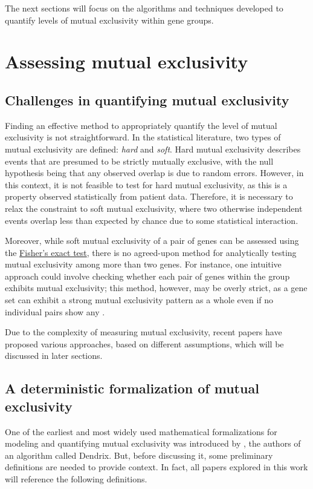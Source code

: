 The next sections will focus on the algorithms and techniques developed to quantify levels of mutual exclusivity within gene groups.

\section{Assessing mutual exclusivity}

\subsection{Challenges in quantifying mutual exclusivity}

Finding an effective method to appropriately quantify the level of mutual exclusivity is not straightforward. In the statistical literature, two types of mutual exclusivity are defined: \textit{hard} and \textit{soft}. Hard mutual exclusivity describes events that are presumed to be strictly mutually exclusive, with the null hypothesis being that any observed overlap is due to random errors. However, in this context, it is not feasible to test for hard mutual exclusivity, as this is a property observed statistically from patient data. Therefore, it is necessary to relax the constraint to soft mutual exclusivity, where two otherwise independent events overlap less than expected by chance due to some statistical interaction.

Moreover, while soft mutual exclusivity of a pair of genes can be assessed using the \href{https://en.wikipedia.org/wiki/Fisher\%27s_exact_test}{Fisher's exact test}, there is no agreed-upon method for analytically testing mutual exclusivity among more than two genes. For instance, one intuitive approach could involve checking whether each pair of genes within the group exhibits mutual exclusivity; this method, however, may be overly strict, as a gene set can exhibit a strong mutual exclusivity pattern as a whole even if no individual pairs show any \cite{mutex}.

Due to the complexity of measuring mutual exclusivity, recent papers have proposed various approaches, based on different assumptions, which will be discussed in later sections.

\subsection{A deterministic formalization of mutual exclusivity}

One of the earliest \cite{survey} and most widely used mathematical formalizations for modeling and quantifying mutual exclusivity was introduced by \textcite{dendrix}, the authors of an algorithm called Dendrix. But, before discussing it, some preliminary definitions are needed to provide context. In fact, all papers explored in this work will reference the following definitions.

